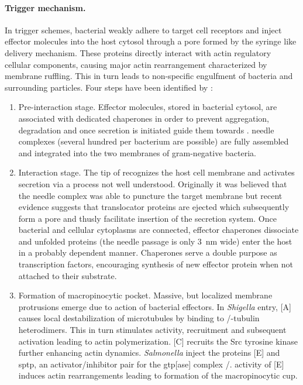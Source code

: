 \paragraph{Trigger mechanism.}
In trigger schemes, bacterial  weakly adhere to target cell receptors and inject effector molecules into the host cytosol through a pore formed by the syringe like delivery mechanism. These proteins directly interact with actin regulatory cellular components, causing major actin rearrangement characterized by membrane ruffling. This in turn leads to non-specific engulfment of bacteria and surrounding particles. Four steps have been identified by \citeauthor{Cossart2004}:
\begin{enumerate}[label=(\alph*)]
  \item Pre-interaction stage. Effector molecules, stored in bacterial cytosol, are associated with dedicated chaperones in order to prevent aggregation, degradation and once secretion is initiated guide them towards .  needle complexes (several hundred per bacterium are possible) are fully assembled and integrated into the two membranes of gram-negative bacteria.
  \item Interaction stage. The tip of  recognizes the host cell membrane and activates secretion via a process not well understood. Originally it was believed that the needle complex was able to puncture the target membrane but recent evidence suggests that translocator proteins are ejected which subsequently form a pore and thusly facilitate insertion of the secretion system. Once bacterial and cellular cytoplasms are connected, effector chaperones dissociate and unfolded proteins (the needle passage is only \SI{3}{\nano\meter} wide) enter the host in a probably  dependent manner. Chaperones serve a double purpose as transcription factors, encouraging synthesis of new effector protein when not attached to their substrate.
  \item Formation of macropinocytic pocket. Massive, but localized membrane protrusions emerge due to action of bacterial effectors. In \textit{Shigella} entry, [A] causes local destabilization of microtubules by binding to \textalpha\slash \textbeta-tubulin heterodimers. This in turn stimulates  activity,  recruitment and subsequent  activation leading to actin polymerization. [C] recruits the Src tyrosine kinase further enhancing actin dynamics. \textit{Salmonella} inject the proteins [E] and \acrshort{sptp}, an activator\slash inhibitor pair for the \acrshort{gtp}[ase] complex \slash {}.  activity of [E] induces actin rearrangements leading to formation of the macropinocytic cup.

\end{enumerate}
